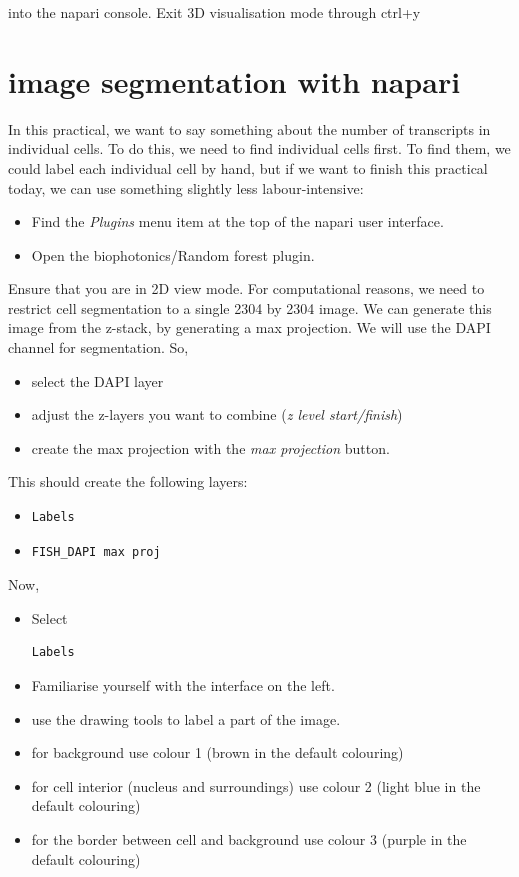 \documentclass[11pt]{article} %
\begin{document}
into the napari console. Exit 3D visualisation mode through ctrl+y

\section{image segmentation with napari}
In this practical, we want to say something about the number of transcripts in individual cells. To do this, we need to find individual cells first. 
To find them, we could label each individual cell by hand, but if we want to finish this practical today, we can use something slightly less labour-intensive:
\begin{itemize}
\item Find the {\it Plugins} menu item at the top of the napari user interface. 
\item Open the biophotonics/Random forest plugin.
\end{itemize}

Ensure that you are in 2D view mode. 
For computational reasons, we need to restrict cell segmentation to a single 2304 by 2304 image. 
We can generate this image from the z-stack, by generating a max projection. 
We will use the DAPI channel for segmentation.
So, 
\begin{itemize}
\item select the DAPI layer
\item adjust the z-layers you want to combine ({\it z level start/finish}) 
\item create the max projection with the {\it max projection} button.
\end{itemize}

This should create the following layers:
 
\begin{itemize}
\item \begin{verbatim}Labels \end{verbatim}
\item \begin{verbatim}FISH_DAPI max proj \end{verbatim}   
\end{itemize}

Now, 

\begin{itemize}
\item Select \begin{verbatim}Labels \end{verbatim}
\item Familiarise yourself with the interface on the left. 
\item use the drawing tools to label a part of the image. 
\item for background use colour 1 (brown in the default colouring)
\item for cell interior (nucleus and surroundings) use colour 2 (light blue in the default colouring)  
\item for the border between cell and background use colour 3 (purple in the default colouring)
\end{itemize}
\end{document}
